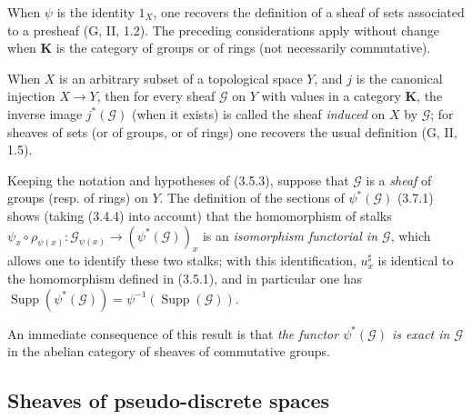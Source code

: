 \begin{env}[3.7.1]
When $\psi$ is the identity $1_X$, one recovers the definition of a sheaf
of sets associated to a presheaf (G, II, 1.2). The preceding
considerations apply without change when $\mathbf{K}$ is the
category of groups or of rings (not necessarily commutative).

When $X$ is an arbitrary subset of a topological space $Y$, and $j$ is
the canonical injection $X\to Y$, then for every sheaf $\mathcal{G}$ on $Y$ with
values in a category $\mathbf{K}$, the inverse image $j^*(\mathcal{G})$ (when it
exists) is called the sheaf \emph{induced} on $X$ by $\mathcal{G}$; for sheaves
of sets (or of groups, or of rings) one recovers the usual definition
(G, II, 1.5).
\end{env}

\begin{env}[3.7.2]
\label{0.3.7.2}
Keeping the notation and hypotheses of (3.5.3), suppose that
$\mathcal{G}$ is a \emph{sheaf} of groups (resp. of rings) on $Y$.
The definition of the sections of $\psi^*(\mathcal{G})$ (3.7.1) shows (taking
(3.4.4) into account) that the homomorphism of stalks
$\psi_x\circ\rho_{\psi(x)}:\mathcal{G}_{\psi(x)}\to
(\psi^*(\mathcal{G}))_x$ is an \emph{isomorphism functorial in
$\mathcal{G}$}, which allows one to identify these two stalks; with this
identification, $u_x^\sharp$ is identical to the homomorphism defined in
(3.5.1), and in particular one has
$\operatorname{Supp}(\psi^*(\mathcal{G}))=
\psi^{-1}(\operatorname{Supp}(\mathcal{G}))$.

An immediate consequence of this result is that \emph{the functor
$\psi^*(\mathcal{G})$ is exact in $\mathcal{G}$} in the abelian category
of sheaves of commutative groups.
\end{env}

\subsection{Sheaves of pseudo-discrete spaces}


